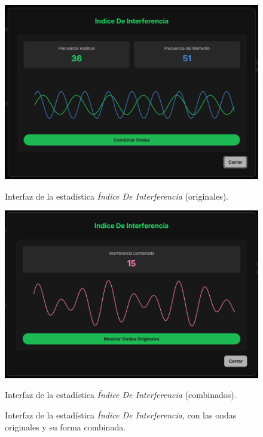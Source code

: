 \begin{figure}[H]
  \centering
  \vspace{-10pt}
  \begin{minipage}{0.47\textwidth}
    \centering
    \includegraphics[width=\textwidth]{figures/capturas_ui/indice_de_interferencia_originales.png}
    \caption{Interfaz de la estadística \textit{Índice De Interferencia} (originales).}
    \label{fig:indice_de_interferencia_originales}
  \end{minipage}
  \begin{minipage}{0.47\textwidth}
    \centering
    \includegraphics[width=\textwidth]{figures/capturas_ui/indice_de_interferencia_combinado.png}
    \caption{Interfaz de la estadística \textit{Índice De Interferencia} (combinados).}
    \label{fig:indice_de_interferencia_combinado}
  \end{minipage}
  \caption{Interfaz de la estadística \textit{Índice De Interferencia}, con las ondas originales y su forma combinada.}
  \label{fig:indice_de_interferencia}
\end{figure}

